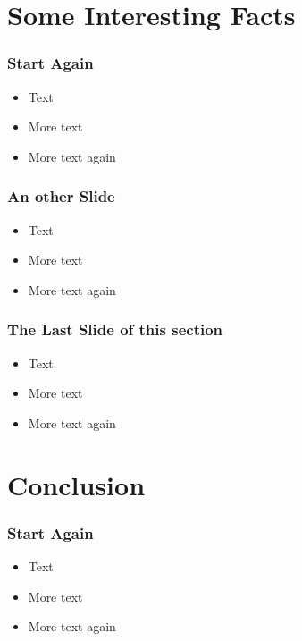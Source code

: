 \section{Some Interesting Facts}

\begin{frame} 
\frametitle{Start Again}
  \begin{itemize}
  \item Text
  \item More text
  \item More text again
  \end{itemize}
\end{frame}


\begin{frame} 
\frametitle{An other Slide}
  \begin{itemize}
  \item Text
  \item More text
  \item More text again
  \end{itemize}
\end{frame}


\begin{frame} 
\frametitle{The Last Slide of this section}
  \begin{itemize}
  \item Text
  \item More text
  \item More text again
  \end{itemize}
\end{frame}

\section{Conclusion}

\begin{frame} 
\frametitle{Start Again}
  \begin{itemize}
  \item Text
  \item More text
  \item More text again
  \end{itemize}
\end{frame}

